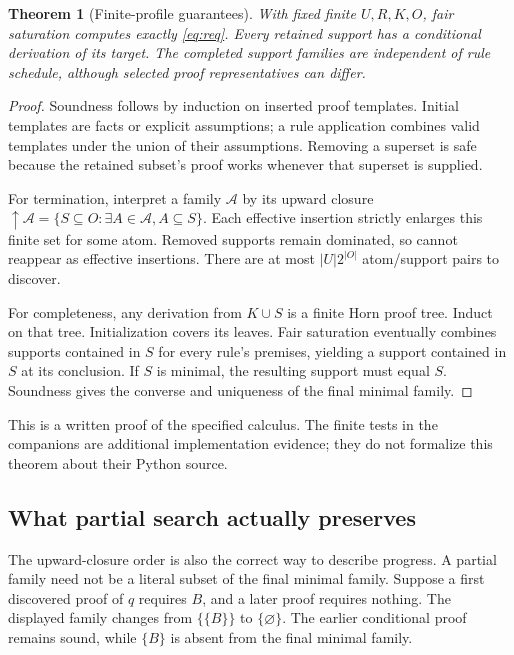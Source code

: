 \documentclass[11pt,letterpaper]{article}
\newtheorem{theorem}[proposition]{Theorem}
\theoremstyle{definition}\newtheorem{definition}[proposition]{Definition}
\theoremstyle{remark}\newtheorem{remark}[proposition]{Remark}
\begin{document}
\begin{theorem}[Finite-profile guarantees]\label{thm:support}
With fixed finite $U,R,K,O$, fair saturation computes exactly
\eqref{eq:req}. Every retained support has a conditional derivation of its
target. The completed support families are independent of rule schedule,
although selected proof representatives can differ.
\end{theorem}
\begin{proof}
Soundness follows by induction on inserted proof templates. Initial templates
are facts or explicit assumptions; a rule application combines valid templates
under the union of their assumptions. Removing a superset is safe because
the retained subset's proof works whenever that superset is supplied.

For termination, interpret a family $\mathcal A$ by its upward closure
$\uparrow\mathcal A=\{S\subseteq O:\exists A\in\mathcal A, A\subseteq S\}$.
Each effective insertion strictly enlarges this finite set for some atom.
Removed supports remain dominated, so cannot reappear as effective insertions.
There are at most $|U|2^{|O|}$ atom/support pairs to discover.

For completeness, any derivation from $K\cup S$ is a finite Horn proof tree.
Induct on that tree. Initialization covers its leaves. Fair saturation
eventually combines supports contained in $S$ for every rule's premises,
yielding a support contained in $S$ at its conclusion. If $S$ is minimal,
the resulting support must equal $S$. Soundness gives the converse and
uniqueness of the final minimal family.
\end{proof}
This is a written proof of the specified calculus. The finite tests in the
companions are additional implementation evidence; they do not formalize
this theorem about their Python source.

\subsection{What partial search actually preserves}

The upward-closure order is also the correct way to describe progress. A
partial family need not be a literal subset of the final minimal family.
Suppose a first discovered proof of $q$ requires $B$, and a later proof
requires nothing. The displayed family changes from $\{\{B\}\}$ to
$\{\varnothing\}$. The earlier conditional proof remains sound, while
$\{B\}$ is absent from the final minimal family.
\end{document}
